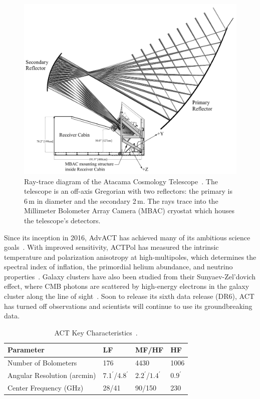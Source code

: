 \begin{figure}[t]
    \centering
    \includegraphics[width = \textwidth]{Figures/act_inst.pdf}
    \caption{Ray-trace diagram of the Atacama Cosmology Telescope~\cite{act_inst}.  The telescope is an off-axis Gregorian with two reflectors: the primary is 6\,m in diameter and the secondary 2\,m.  The rays trace into the Millimeter Bolometer Array Camera (MBAC) cryostat which houses the telescope's detectors.}
    \label{fig:act_inst}
\end{figure}

Since its inception in 2016, AdvACT has achieved many of its ambitious science goals~\cite{2016JLTP184772H}.  With improved sensitivity, ACTPol has measured the intrinsic temperature and polarization anisotropy at high-multipoles, which determines the spectral index of inflation, the primordial helium abundance, and neutrino properties~\cite{10.1117/12.857464}.  Galaxy clusters have also been studied from their Sunyaev-Zel’dovich effect, where CMB photons are scattered by high-energy electrons in the galaxy cluster along the line of sight~\cite{weinberg_cosmo}.  Soon to release its sixth data release (DR6), ACT has turned off observations and scientists will continue to use its groundbreaking data.

\begin{table}[b]
    \centering
    \begin{tabular}{|l|l|l|l|} \hline
        \textbf{ Parameter} & \textbf{LF}   &  \textbf{MF/HF}  & \textbf{HF}  \\ \hline \hline
        Number of Bolometers & 176 & 4430 &1006 \\\hline
        Angular Resolution (arcmin) & $7.1^{\prime}$/$4.8^{\prime}$ & $2.2^{\prime}$/$1.4^{\prime}$ & $0.9^{\prime}$ \\\hline
        Center Frequency (GHz) & 28/41 & 90/150 & 230\\\hline
    \end{tabular} \caption{ACT Key Characteristics~\cite{2016JLTP184772H}.}
    \label{tab:act}
\end{table}
